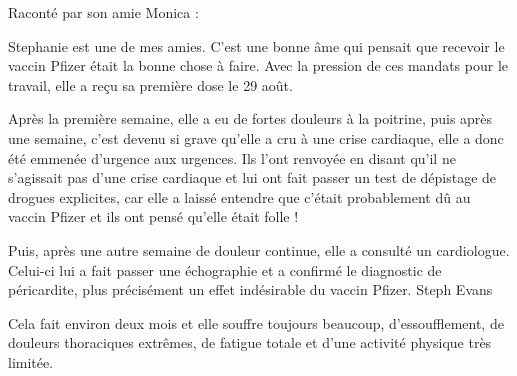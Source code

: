 Raconté par son amie Monica :

Stephanie est une de mes amies. C'est une bonne âme qui pensait que recevoir le
vaccin Pfizer était la bonne chose à faire. Avec la pression de ces mandats pour
le travail, elle a reçu sa première dose le 29 août.

Après la première semaine, elle a eu de fortes douleurs à la poitrine, puis
après une semaine, c'est devenu si grave qu'elle a cru à une crise cardiaque,
elle a donc été emmenée d'urgence aux urgences. Ils l'ont renvoyée en disant
qu'il ne s'agissait pas d'une crise cardiaque et lui ont fait passer un test de
dépistage de drogues explicites, car elle a laissé entendre que c'était
probablement dû au vaccin Pfizer et ils ont pensé qu'elle était folle !

Puis, après une autre semaine de douleur continue, elle a consulté un
cardiologue. Celui-ci lui a fait passer une échographie et a confirmé le
diagnostic de péricardite, plus précisément un effet indésirable du vaccin
Pfizer. Steph Evans

Cela fait environ deux mois et elle souffre toujours beaucoup, d'essoufflement,
de douleurs thoraciques extrêmes, de fatigue totale et d'une activité physique
très limitée.
